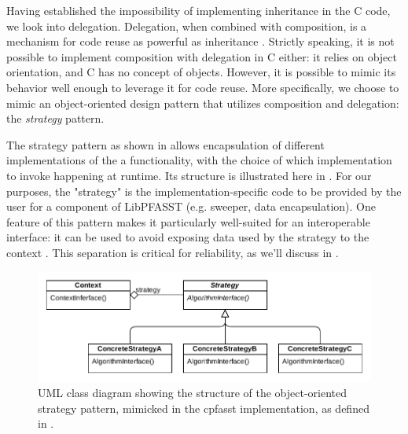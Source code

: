 Having established the impossibility of implementing inheritance in the C code, we look into delegation. Delegation, when combined with composition, is a mechanism for code reuse as powerful as inheritance \cite{gamma1994design}. Strictly speaking, it is not possible to implement composition with delegation in C either: it relies on object orientation, and C has no concept of objects. However, it is possible to mimic its behavior well enough to leverage it for code reuse. More specifically, we choose to mimic an object-oriented design pattern that utilizes composition and delegation: the \textit{strategy} pattern.

The strategy pattern as shown in \cite{gamma1994design} allows encapsulation of different implementations of the a functionality, with the choice of which implementation to invoke happening at runtime. Its structure is illustrated here in . For our purposes, the "strategy" is the implementation-specific code to be provided by the user for a component of LibPFASST (e.g. sweeper, data encapsulation). One feature of this pattern makes it particularly well-suited for an interoperable interface: it can be used to avoid exposing data used by the strategy to the context \cite{gamma1994design}. This separation is critical for reliability, as we'll discuss in .

\begin{figure}[ht]
  \centering
  \includegraphics[width=\textwidth]{images/uml_strategy_pattern.pdf}
  \caption{UML class diagram showing the structure of the object-oriented strategy pattern, mimicked in the cpfasst implementation, as defined in \cite{gamma1994design}.}
  \label{fig:uml_strategy_pattern}
\end{figure}

